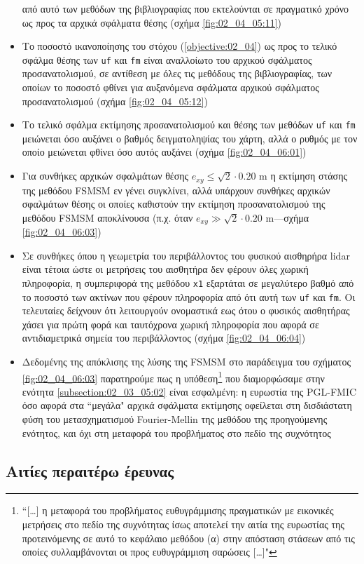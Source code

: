 \begin{itemize}
        από αυτό των μεθόδων της βιβλιογραφίας που εκτελούνται σε πραγματικό
        χρόνο ως προς τα αρχικά σφάλματα θέσης (σχήμα \ref{fig:02_04_05:11})
  \item Το ποσοστό ικανοποίησης του στόχου (\ref{objective:02_04}) ως προς
        το τελικό σφάλμα θέσης των \texttt{uf} και \texttt{fm} είναι αναλλοίωτο
        του αρχικού σφάλματος προσανατολισμού, σε αντίθεση με όλες τις μεθόδους
        της βιβλιογραφίας, των οποίων το ποσοστό φθίνει για αυξανόμενα σφάλματα
        αρχικού σφάλματος προσανατολισμού (σχήμα \ref{fig:02_04_05:12})
  \item Το τελικό σφάλμα εκτίμησης προσανατολισμού και θέσης των μεθόδων
        \texttt{uf} και \texttt{fm} μειώνεται όσο αυξάνει ο βαθμός
        δειγματοληψίας του χάρτη, αλλά ο ρυθμός με τον οποίο μειώνεται φθίνει
        όσο αυτός αυξάνει (σχήμα \ref{fig:02_04_06:01})
  \item Για συνθήκες αρχικών σφαλμάτων θέσης $e_{xy} \leq \sqrt{2}\cdot 0.20$ m
        η εκτίμηση στάσης της μεθόδου FSMSM εν γένει συγκλίνει, αλλά υπάρχουν
        συνθήκες αρχικών σφαλμάτων θέσης οι οποίες καθιστούν την εκτίμηση
        προσανατολισμού της μεθόδου FSMSM αποκλίνουσα (π.χ.  όταν $e_{xy} \gg
        \sqrt{2}\cdot 0.20$ m---σχήμα \ref{fig:02_04_06:03})
  \item Σε συνθήκες όπου η γεωμετρία του περιβάλλοντος του φυσικού αισθηρήρα
        lidar είναι τέτοια ώστε οι μετρήσεις του αισθητήρα δεν φέρουν όλες
        χωρική πληροφορία, η συμπεριφορά της μεθόδου \texttt{x1} εξαρτάται
        σε μεγαλύτερο βαθμό από το ποσοστό των ακτίνων που φέρουν πληροφορία
        από ότι αυτή των \texttt{uf} και \texttt{fm}. Οι τελευταίες δείχνουν
        ότι λειτουργούν ονομαστικά εως ότου ο φυσικός αισθητήρας χάσει για
        πρώτη φορά και ταυτόχρονα χωρική πληροφορία που αφορά σε αντιδιαμετρικά
        σημεία του περιβάλλοντος (σχήμα \ref{fig:02_04_06:04})
  \item Δεδομένης της απόκλισης της λύσης της FSMSM στο παράδειγμα του σχήματος
        \ref{fig:02_04_06:03} παρατηρούμε πως η υπόθεση\footnote{``[\dots] η
        μεταφορά του προβλήματος ευθυγράμμισης πραγματικών με εικονικές
        μετρήσεις στο πεδίο της συχνότητας ίσως αποτελεί την αιτία της
        ευρωστίας της προτεινόμενης σε αυτό το κεφάλαιο μεθόδου (α) στην
        απόσταση στάσεων από τις οποίες συλλαμβάνονται οι προς ευθυγράμμιση
        σαρώσεις [\dots]"} που διαμορφώσαμε στην ενότητα
        \ref{subsection:02_03_05:02} είναι εσφαλμένη: η ευρωστία της PGL-FMIC
        όσο αφορά στα ``μεγάλα" αρχικά σφάλματα εκτίμησης οφείλεται στη
        δισδιάστατη φύση του μετασχηματισμού Fourier-Mellin της μεθόδου της
        προηγούμενης ενότητος, και όχι στη μεταφορά του προβλήματος στο πεδίο
        της συχνότητος
\end{itemize}


\subsection{Αιτίες περαιτέρω έρευνας}
\label{subsection:02_04_07:02}

